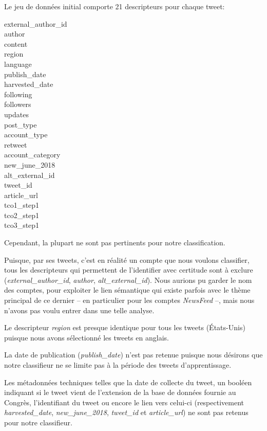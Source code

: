\documentclass[twocolumn,10pt]{article}
\begin{document}
Le jeu de données initial comporte 21 descripteurs pour chaque tweet:
\begin{multicols}{3}
\noindent external\_author\_id \\ %
author \\ %
content \\ 
region \\ %
language \\ %
publish\_date \\ %
harvested\_date \\ %
following \\ %
followers \\ %
updates \\ %
post\_type \\ %
account\_type \\ %
retweet \\ %
account\_category \\ %
new\_june\_2018 \\ %
alt\_external\_id \\ %
tweet\_id \\ %
article\_url \\ %
tco1\_step1 \\ %
tco2\_step1 \\ %
tco3\_step1 %
\end{multicols}

Cependant, la plupart ne sont pas pertinents pour notre classification.

Puisque, par ses tweets, c'est en réalité un compte que nous voulons classifier, tous les descripteurs qui permettent de l'identifier avec certitude sont à exclure (\textit{external\_author\_id}, \textit{author}, \textit{alt\_external\_id}). Nous aurions pu garder le nom des comptes, pour exploiter le lien sémantique qui existe parfois avec le thème principal de ce dernier -- en particulier pour les comptes \textit{NewsFeed} --, mais nous n'avons pas voulu entrer dans une telle analyse.

Le descripteur \textit{region} est presque identique pour tous les tweets (États-Unis) puisque nous avons sélectionné les tweets en anglais.

La date de publication (\textit{publish\_date}) n'est pas retenue puisque nous désirons que notre classifieur ne se limite pas à la période des tweets d'apprentissage.

Les métadonnées techniques telles que la date de collecte du tweet, un booléen indiquant si le tweet  vient de l'extension de la base de données fournie au Congrès, l'identifiant du tweet ou encore le lien vers celui-ci (respectivement \textit{harvested\_date}, \textit{new\_june\_2018}, \textit{tweet\_id} et \textit{article\_url}) ne sont pas retenus pour notre classifieur.
\end{document}
